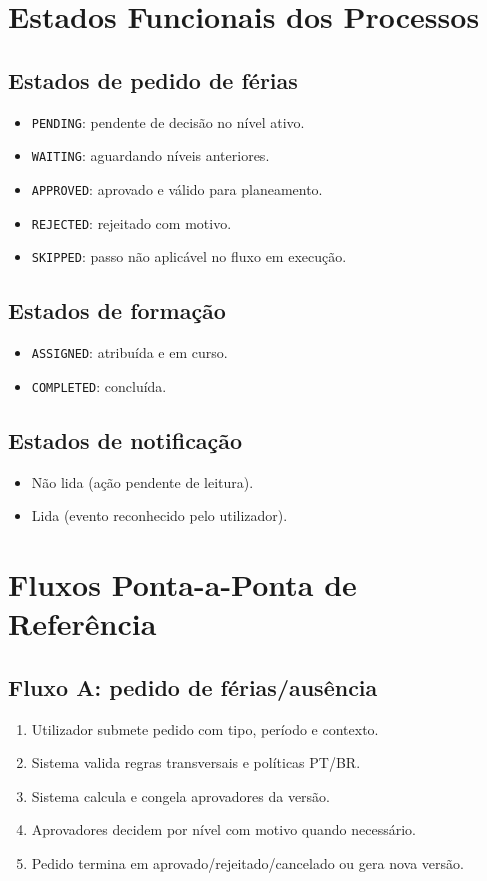 \documentclass[11pt,a4paper,twoside]{article}
\begin{document}
\section{Estados Funcionais dos Processos}

\subsection{Estados de pedido de férias}
\begin{itemize}
  \item \texttt{PENDING}: pendente de decisão no nível ativo.
  \item \texttt{WAITING}: aguardando níveis anteriores.
  \item \texttt{APPROVED}: aprovado e válido para planeamento.
  \item \texttt{REJECTED}: rejeitado com motivo.
  \item \texttt{SKIPPED}: passo não aplicável no fluxo em execução.
\end{itemize}

\subsection{Estados de formação}
\begin{itemize}
  \item \texttt{ASSIGNED}: atribuída e em curso.
  \item \texttt{COMPLETED}: concluída.
\end{itemize}

\subsection{Estados de notificação}
\begin{itemize}
  \item Não lida (ação pendente de leitura).
  \item Lida (evento reconhecido pelo utilizador).
\end{itemize}

\section{Fluxos Ponta-a-Ponta de Referência}

\subsection{Fluxo A: pedido de férias/ausência}
\begin{enumerate}
  \item Utilizador submete pedido com tipo, período e contexto.
  \item Sistema valida regras transversais e políticas PT/BR.
  \item Sistema calcula e congela aprovadores da versão.
  \item Aprovadores decidem por nível com motivo quando necessário.
  \item Pedido termina em aprovado/rejeitado/cancelado ou gera nova versão.
\end{enumerate}
\end{document}
